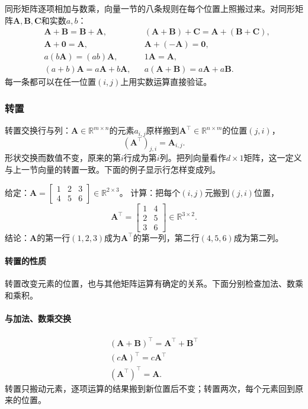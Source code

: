 同形矩阵逐项相加与数乘，向量一节的八条规则在每个位置上照搬过来。对同形矩阵$\bm A,\bm B,\bm C$和实数$a,b$：
\[
\begin{aligned}
 &\bm A+\bm B=\bm B+\bm A, && (\bm A+\bm B)+\bm C=\bm A+(\bm B+\bm C),\\
 &\bm A+\bm0=\bm A, && \bm A+(-\bm A)=\bm0,\\
 &a(b\bm A)=(ab)\bm A, && 1\bm A=\bm A,\\
 &(a+b)\bm A=a\bm A+b\bm A, && a(\bm A+\bm B)=a\bm A+a\bm B.
\end{aligned}
\]
每一条都可以在任一位置$(i,j)$上用实数运算直接验证。


\subsubsection{转置}

转置交换行与列：$\bm A\in\mathbb R^{m\times n}$的元素$a_{i,j}$原样搬到$\bm A^\top\in\mathbb R^{n\times m}$的位置$(j,i)$，
\[
 (\bm A^\top)_{j,i}=\bm A_{i,j}.
\]
形状交换而数值不变，原来的第$i$行成为第$i$列。把列向量看作$d\times1$矩阵，这一定义与上一节向量的转置一致。下面的例子显示行怎样变成列。
\begin{example}
\label{ex:ls-transpose-two-by-three}
给定：$\bm A=\left[\begin{smallmatrix}1&2&3\\4&5&6\end{smallmatrix}\right]\in\mathbb R^{2\times3}$。
计算：把每个$(i,j)$元搬到$(j,i)$位置，
\[
 \bm A^\top=\begin{bmatrix}1&4\\2&5\\3&6\end{bmatrix}\in\mathbb R^{3\times2}.
\]
结论：$\bm A$的第一行$(1,2,3)$成为$\bm A^\top$的第一列，第二行$(4,5,6)$成为第二列。
\end{example}

\paragraph{转置的性质}
\label{sec:ls-reshaping}

转置改变元素的位置，也与其他矩阵运算有确定的关系。下面分别检查加法、数乘和乘积。

\paragraph{与加法、数乘交换}
\[
 \begin{gathered}
(\bm A+\bm B)^\top=\bm A^\top+\bm B^\top\\
(c\bm A)^\top=c\bm A^\top\\
(\bm A^\top)^\top=\bm A.
 \end{gathered}
\]
转置只搬动元素，逐项运算的结果搬到新位置后不变；转置两次，每个元素回到原来的位置。

